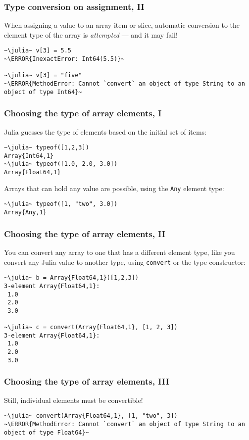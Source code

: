 \documentclass[english,serif,mathserif,xcolor=pdftex,dvipsnames,table]{beamer}
\begin{document}
\begin{frame}
  \frametitle{Type conversion on assignment, II}
  When assigning a value to an array item or slice, automatic
  conversion to the element type of the array is \emph{attempted} ---
  and it may fail!
\begin{lstlisting}
~\julia~ v[3] = 5.5
~\ERROR{InexactError: Int64(5.5)}~

~\julia~ v[3] = "five"
~\ERROR{MethodError: Cannot `convert` an object of type String to an object of type Int64}~

\end{lstlisting}
\end{frame}


\begin{frame}
  \frametitle{Choosing the type of array elements, I}
  Julia guesses the type of elements based on the initial set of items:
\begin{lstlisting}
~\julia~ typeof([1,2,3])
Array{Int64,1}
~\julia~ typeof([1.0, 2.0, 3.0])
Array{Float64,1}
\end{lstlisting}

  \+ Arrays that can hold any value are possible, using the
  \texttt{Any} element type:
\begin{lstlisting}
~\julia~ typeof([1, "two", 3.0])
Array{Any,1}
\end{lstlisting}
\end{frame}


\begin{frame}
  \frametitle{Choosing the type of array elements, II}
  You can convert any array to one that has a different element type,
  like you convert any Julia value to another type, using
  \texttt{convert} or the type constructor:
\begin{lstlisting}
~\julia~ b = Array{Float64,1}([1,2,3])
3-element Array{Float64,1}:
 1.0
 2.0
 3.0

~\julia~ c = convert(Array{Float64,1}, [1, 2, 3])
3-element Array{Float64,1}:
 1.0
 2.0
 3.0
\end{lstlisting}
\end{frame}


\begin{frame}
  \frametitle{Choosing the type of array elements, III}

  Still, individual elements must be convertible!
\begin{lstlisting}
~\julia~ convert(Array{Float64,1}, [1, "two", 3])
~\ERROR{MethodError: Cannot `convert` an object of type String to an object of type Float64}~

\end{lstlisting}
\end{frame}
\end{document}
